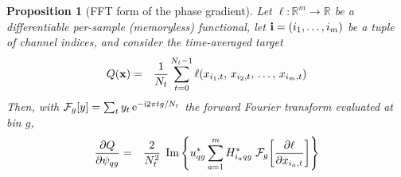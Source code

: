 \documentclass[10pt,a4paper]{article}
\numberwithin{equation}{section}
\DeclarePairedDelimiter\block{[}{]}
\DeclarePairedDelimiter\mat{(}{)}
\DeclareMathOperator{\Imag}{Im}
\newcommand{\im}[1]{\Imag\left\{#1\right\}}
\newcommand{\m}[1]{\mathrm{#1}}
\newtheorem{proposition}{Proposition}
\begin{document}
\begin{proposition}[FFT form of the phase gradient]\label{prop:fft}
Let $\ell:\mathbb{R}^m\to\mathbb{R}$ be a differentiable per-sample (memoryless) functional, let $\mathbf{i} = \mat{i_1,\ldots,i_m}$ be a tuple of channel indices, and consider the time-averaged target
\begin{eqnarray}
Q\mat{\mathbf{x}} &=& \frac{1}{N_t}\sum_{t=0}^{N_t-1} \ell \mat{x_{i_1, t},\, x_{i_2, t},\, \ldots,\, x_{i_m, t}}
\end{eqnarray}
Then, with $\mathcal{F}_g\block{y} = \sum_t y_t\,\m{e}^{-\m{i} 2\pi t g/N_t}$ the forward Fourier transform evaluated at bin $g$,
\begin{eqnarray}
\frac{\partial Q}{\partial \psi_{q g}}
	&=&  \frac{2}{N_t^2}\;\im{u_{q g}^* \sum_{a=1}^{m} H_{i_a q g}^*\;
				 \mathcal{F}_g\block*{\frac{\partial \ell}{\partial x_{i_a,t}}} }	
\end{eqnarray}
\end{proposition}

\newcommand{\partialEll}{\frac{\partial \ell}{\partial x_{i_a,t}}}
\newcommand{\partialEllX}{\partialEll \mat{x_{i_1,t},\ldots,x_{i_m,t}}}
\end{document}
